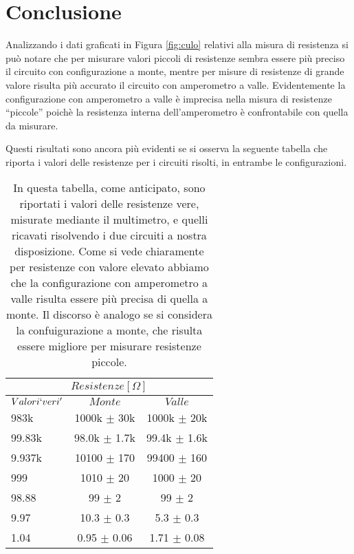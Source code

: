 \section*{Conclusione}

Analizzando i dati graficati in Figura \ref{fig:culo} relativi alla misura di resistenza si può notare che per misurare valori piccoli di resistenze sembra essere più preciso il circuito con configurazione a monte, mentre per misure di resistenze di grande valore risulta più accurato il circuito con amperometro a valle.
Evidentemente la configurazione con amperometro a valle è imprecisa nella misura di resistenze ``piccole'' poichè la resistenza interna dell'amperometro è confrontabile con quella da misurare.

Questi risultati sono ancora più evidenti se si osserva la seguente tabella che riporta i valori delle resistenze per i circuiti risolti, in entrambe le configurazioni. 

\begin{table}[H]
  \centering
  \begin{tabular}{l | c c}
      \multicolumn{3}{c}{\textbf{$Resistenze [\Omega]$}} \\
      \toprule
      $Valori `veri'$ & $Monte$ & $Valle$ \\
      \midrule
      983k   & 1000k $\pm$ 30k & 1000k $\pm$ 20k \\
      99.83k & 98.0k $\pm$ 1.7k & 99.4k $\pm$ 1.6k \\
      9.937k & 10100 $\pm$ 170 & 99400 $\pm$ 160 \\
      999    & 1010 $\pm$ 20 & 1000 $\pm$ 20 \\
      98.88  & 99 $\pm$ 2 & 99 $\pm$ 2 \\
      9.97   & 10.3 $\pm$ 0.3 & 5.3 $\pm$ 0.3 \\
      1.04   & 0.95 $\pm$ 0.06 & 1.71 $\pm$ 0.08 \\
      \bottomrule
  \end{tabular}
  \caption{In questa tabella, come anticipato, sono riportati i valori delle resistenze vere, misurate mediante il multimetro, e quelli ricavati risolvendo i due circuiti a nostra disposizione. Come si vede chiaramente per resistenze con valore elevato abbiamo che la configurazione con amperometro a valle risulta essere più precisa di quella a monte. Il discorso è analogo se si considera la confuigurazione a monte, che risulta essere migliore per misurare resistenze piccole.}
\end{table}

